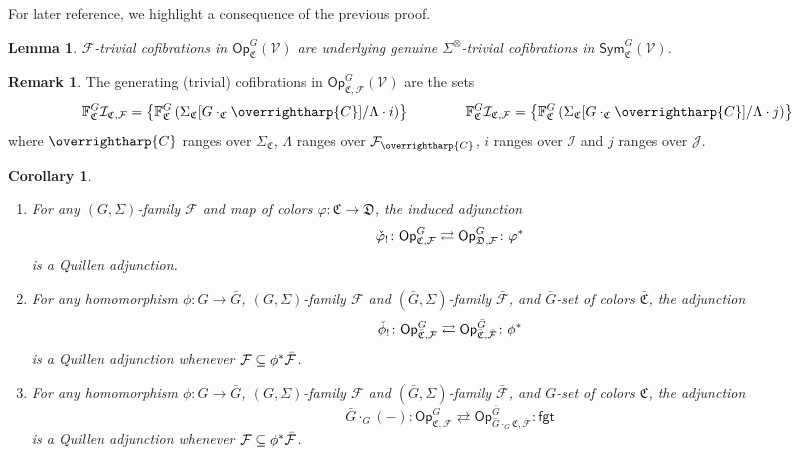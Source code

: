 \documentclass[a4paper,10pt
,draft
]{article}%
\numberwithin{equation}{section}
\numberwithin{figure}{section}
\newtheorem{lemma}[equation]{Lemma}%
\newtheorem{corollary}[equation]{Corollary}%
\theoremstyle{definition} %
\newtheorem{remark}[equation]{Remark}%
\newcommand{\vect}[1]{\text{\overrightharp{\ensuremath{#1}}}}
\newcommand{\Op}{\mathsf{Op}}%
\newcommand{\F}{\ensuremath{\mathcal F}}
\newcommand{\V}{\ensuremath{\mathcal V}}
\newcommand{\1}{\ensuremath{\mathbbm 1}}%
\begin{document}
For later reference, 
we highlight a consequence of the previous proof.


\begin{lemma}\label{GOTC_LEM}
$\F$-trivial cofibrations in $\Op^G_{\mathfrak C}(\V)$ are underlying genuine $\Sigma^{\otimes}$-trivial cofibrations
in $\mathsf{Sym}^G_{\mathfrak C}(\V)$.
\end{lemma}

\begin{remark}
The generating (trivial) cofibrations in
$\mathsf{Op}^G_{\mathfrak{C},\F}(\V)$
are the sets
\begin{equation}\label{FVGSIGF EQ}
	\mathbb{F}^G_{\mathfrak{C}}\mathcal{I}_{\mathfrak{C},\mathcal{F}}
=
	\left\{
	\mathbb{F}^G_{\mathfrak{C}}
	\left(\Sigma_{\mathfrak{C}}[G \cdot_{\mathfrak{C}} \vect{C}]/\Lambda \cdot i \right)
	\right\}
\qquad \qquad
	\mathbb{F}^G_{\mathfrak{C}}\mathcal{I}_{\mathfrak{C},\mathcal{F}}
=
	\left\{
	\mathbb{F}^G_{\mathfrak{C}}
	\left(\Sigma_{\mathfrak{C}}[G \cdot_{\mathfrak{C}} \vect{C}]/\Lambda \cdot j \right)
	\right\}
\end{equation}
where $\vect{C}$ ranges over $\Sigma_{\mathfrak{C}}$,
$\Lambda$ ranges over $\F_{\vect{C}}$,
$i$ ranges over $\mathcal{I}$ and
$j$ ranges over $\mathcal{J}$.
\end{remark}



\begin{corollary}\label{OPADJ_COR}
\begin{enumerate}[label=(\roman*)]
\item \label{OPCOCHADJ_LBL}
	For any $(G,\Sigma)$-family $\F$ and map of colors 
	$\varphi \colon \mathfrak C \to \mathfrak D$, the induced adjunction
		\[
		\check{\varphi}_! \colon \mathsf{Op}^G_{\mathfrak{C},\F}
			\rightleftarrows
		\mathsf{Op}^G_{\mathfrak{D},\F} \colon \varphi^{\**}
		\]
	is a Quillen adjunction.
\item \label{OPFIXSETCHGR_LBL}
	For any homomorphism $\phi \colon G \to \bar G$,
	$(G,\Sigma)$-family $\F$ and $(\bar G,\Sigma)$-family $\bar{\F}$,
	and $\bar G$-set of colors $\bar{\mathfrak C}$,
	the adjunction
		\[
		\check{\phi}_! \colon \mathsf{Op}^G_{\bar{\mathfrak{C}},\F}
			\rightleftarrows
		\mathsf{Op}^{\bar{G}}_{\bar{\mathfrak{C}},\bar{\F}} \colon \phi^{\**}
		\]
	is a Quillen adjunction whenever $\F \subseteq \phi^{\**} \bar{\F}$.
\item \label{OPCOMBADJ_LBL}
	For any homomorphism $\phi \colon G \to \bar G$,
	$(G,\Sigma)$-family $\F$ and $(\bar G,\Sigma)$-family $\bar{\F}$,
	and $G$-set of colors $\mathfrak C$,
	the adjunction
            \[
                  \bar{G} \cdot_G (-) \colon \mathsf{Op}^G_{\mathfrak{C},\F}
                  \rightleftarrows
                  \mathsf{Op}^{\bar{G}}_{\bar{G} \cdot_G \mathfrak{C},\bar{\F}} \colon \mathsf{fgt}
            \]
	is a Quillen adjunction whenever $\F \subseteq \phi^{\**} \bar{\F}$.
      \end{enumerate}
\end{corollary}
\end{document}
